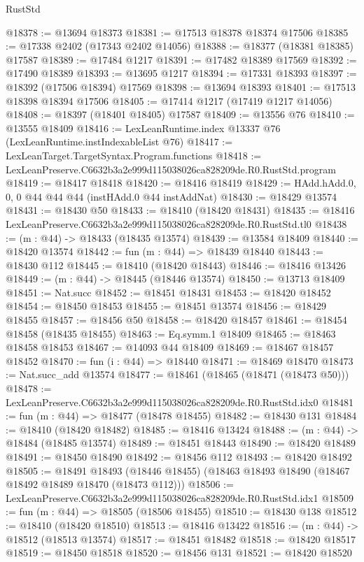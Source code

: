 \begin{lexlean}{RustStd}
\begin{coremodule}
@18378 := @13694 @18373
@18381 := @17513 @18378 @18374 @17506
@18385 := @17338 @2402 (@17343 @2402 @14056)
@18388 := @18377 (@18381 @18385) @17587
@18389 := @17484 @1217
@18391 := @17482 @18389 @17569
@18392 := @17490 @18389
@18393 := @13695 @1217
@18394 := @17331 @18393
@18397 := @18392 (@17506 @18394) @17569
@18398 := @13694 @18393
@18401 := @17513 @18398 @18394 @17506
@18405 := @17414 @1217 (@17419 @1217 @14056)
@18408 := @18397 (@18401 @18405) @17587
@18409 := @13556 @76
@18410 := @13555 @18409
@18416 := LexLeanRuntime.index @13337 @76 (LexLeanRuntime.instIndexableList @76)
@18417 := LexLeanTarget.TargetSyntax.Program.functions
@18418 := LexLeanPreserve.C6632b3a2e999d115038026ca828209de.R0.RustStd.program
@18419 := @18417 @18418
@18420 := @18416 @18419
@18429 := HAdd.hAdd.{0, 0, 0} @44 @44 @44 (instHAdd.{0} @44 instAddNat)
@18430 := @18429 @13574
@18431 := @18430 @50
@18433 := @18410 (@18420 @18431)
@18435 := @18416 LexLeanPreserve.C6632b3a2e999d115038026ca828209de.R0.RustStd.tl0
@18438 := (m : @44) -> @18433 (@18435 @13574)
@18439 := @13584 @18409
@18440 := @18420 @13574
@18442 := fun (m : @44) => @18439 @18440
@18443 := @18430 @112
@18445 := @18410 (@18420 @18443)
@18446 := @18416 @13426
@18449 := (m : @44) -> @18445 (@18446 @13574)
@18450 := @13713 @18409
@18451 := Nat.succ
@18452 := @18451 @18431
@18453 := @18420 @18452
@18454 := @18450 @18453
@18455 := @18451 @13574
@18456 := @18429 @18455
@18457 := @18456 @50
@18458 := @18420 @18457
@18461 := @18454 @18458 (@18435 @18455)
@18463 := Eq.symm.{1} @18409
@18465 := @18463 @18458 @18453
@18467 := @14093 @44 @18409
@18469 := @18467 @18457 @18452
@18470 := fun (i : @44) => @18440
@18471 := @18469 @18470
@18473 := Nat.succ_add @13574
@18477 := @18461 (@18465 (@18471 (@18473 @50)))
@18478 := LexLeanPreserve.C6632b3a2e999d115038026ca828209de.R0.RustStd.idx0
@18481 := fun (m : @44) => @18477 (@18478 @18455)
@18482 := @18430 @131
@18484 := @18410 (@18420 @18482)
@18485 := @18416 @13424
@18488 := (m : @44) -> @18484 (@18485 @13574)
@18489 := @18451 @18443
@18490 := @18420 @18489
@18491 := @18450 @18490
@18492 := @18456 @112
@18493 := @18420 @18492
@18505 := @18491
    @18493
    (@18446 @18455)
    (@18463 @18493 @18490 (@18467 @18492 @18489 @18470 (@18473 @112)))
@18506 := LexLeanPreserve.C6632b3a2e999d115038026ca828209de.R0.RustStd.idx1
@18509 := fun (m : @44) => @18505 (@18506 @18455)
@18510 := @18430 @138
@18512 := @18410 (@18420 @18510)
@18513 := @18416 @13422
@18516 := (m : @44) -> @18512 (@18513 @13574)
@18517 := @18451 @18482
@18518 := @18420 @18517
@18519 := @18450 @18518
@18520 := @18456 @131
@18521 := @18420 @18520

\end{coremodule}
\end{lexlean}
